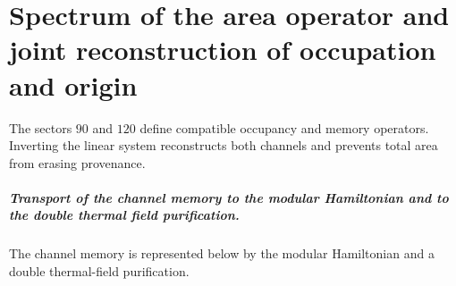 \chapter{Spectrum of the area operator and joint reconstruction of occupation and origin}
\label{chap:parte-iv-59}

The sectors \(90\) and \(120\) define compatible occupancy and
memory operators. Inverting the linear system reconstructs both channels
and prevents total area from erasing provenance.



\paragraph{Transport of the channel memory to the modular Hamiltonian and to the double thermal field purification.} The channel memory is represented below by the modular Hamiltonian and a double thermal-field purification.
